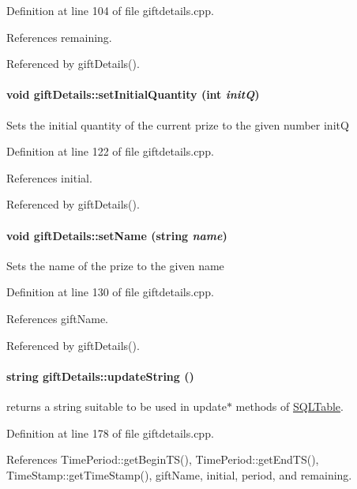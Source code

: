 Definition at line 104 of file giftdetails.cpp.

References remaining.

Referenced by gift\-Details().\hypertarget{classgiftDetails_giftDetailsa11}{
\paragraph[setInitialQuantity]{\setlength{\rightskip}{0pt plus 5cm}void gift\-Details::set\-Initial\-Quantity (int {\em init\-Q})}\hfill}
\label{classgiftDetails_giftDetailsa11}


Sets the initial quantity of the current prize to the given number init\-Q 

Definition at line 122 of file giftdetails.cpp.

References initial.

Referenced by gift\-Details().\hypertarget{classgiftDetails_giftDetailsa10}{
\paragraph[setName]{\setlength{\rightskip}{0pt plus 5cm}void gift\-Details::set\-Name (string {\em name})}\hfill}
\label{classgiftDetails_giftDetailsa10}


Sets the name of the prize to the given name 

Definition at line 130 of file giftdetails.cpp.

References gift\-Name.

Referenced by gift\-Details().\hypertarget{classgiftDetails_giftDetailsa13}{
\paragraph[updateString]{\setlength{\rightskip}{0pt plus 5cm}string gift\-Details::update\-String ()}\hfill}
\label{classgiftDetails_giftDetailsa13}


returns a string suitable to be used in update$\ast$ methods of \hyperlink{classSQLTable}{SQLTable}. 

Definition at line 178 of file giftdetails.cpp.

References Time\-Period::get\-Begin\-TS(), Time\-Period::get\-End\-TS(), Time\-Stamp::get\-Time\-Stamp(), gift\-Name, initial, period, and remaining.

